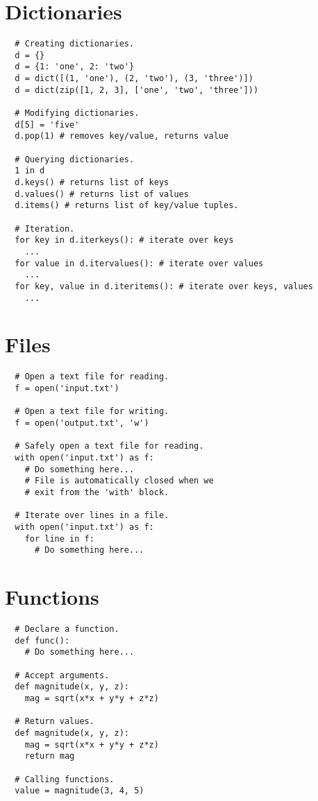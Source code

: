 \documentclass[10pt]{article}
\begin{document}
\section{Dictionaries}
\begin{lstlisting}
  # Creating dictionaries.
  d = {}
  d = {1: 'one', 2: 'two'}
  d = dict([(1, 'one'), (2, 'two'), (3, 'three')])
  d = dict(zip([1, 2, 3], ['one', 'two', 'three']))

  # Modifying dictionaries.
  d[5] = 'five'
  d.pop(1) # removes key/value, returns value

  # Querying dictionaries.
  1 in d
  d.keys() # returns list of keys
  d.values() # returns list of values
  d.items() # returns list of key/value tuples.

  # Iteration.
  for key in d.iterkeys(): # iterate over keys
    ...
  for value in d.itervalues(): # iterate over values
    ...
  for key, value in d.iteritems(): # iterate over keys, values
    ...
\end{lstlisting}

\section{Files}
\begin{lstlisting}
  # Open a text file for reading.
  f = open('input.txt')

  # Open a text file for writing.
  f = open('output.txt', 'w')

  # Safely open a text file for reading.
  with open('input.txt') as f:
    # Do something here...
    # File is automatically closed when we
    # exit from the 'with' block.

  # Iterate over lines in a file.
  with open('input.txt') as f:
    for line in f:
      # Do something here...
\end{lstlisting}

\section{Functions}
\begin{lstlisting}
  # Declare a function.
  def func():
    # Do something here...

  # Accept arguments.
  def magnitude(x, y, z):
    mag = sqrt(x*x + y*y + z*z)

  # Return values.
  def magnitude(x, y, z):
    mag = sqrt(x*x + y*y + z*z)
    return mag

  # Calling functions.
  value = magnitude(3, 4, 5)
\end{lstlisting}
\end{document}
